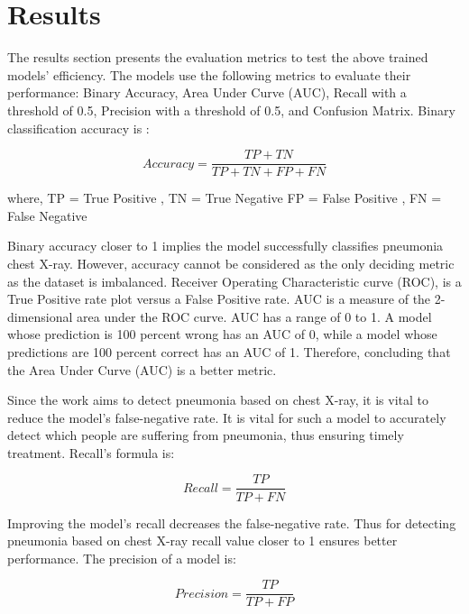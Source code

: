 \documentclass[conference]{IEEEtran}
\begin{document}
\section{Results}
The results section presents the evaluation metrics to test the above trained models’ efficiency. The models use the following metrics to evaluate their performance: Binary Accuracy, Area Under Curve (AUC), Recall with a threshold of 0.5, Precision with a threshold of 0.5, and Confusion Matrix. Binary classification accuracy is :


\begin{equation}
   Accuracy=\frac{TP +TN}{TP +TN + FP +FN}
\end{equation}

where,
\newline
TP = True Positive , TN = True Negative \newline
FP = False Positive , FN = False Negative  
\newline
\par
Binary accuracy closer to 1 implies the model successfully classifies pneumonia chest X-ray. However, accuracy cannot be considered as the only deciding metric as the dataset is imbalanced. Receiver Operating Characteristic curve (ROC), is a True Positive rate plot versus a False Positive rate. AUC is a measure of the 2-dimensional area under the ROC curve. AUC has a range of 0 to 1. A model whose prediction is 100 percent wrong has an AUC of 0, while a model whose predictions are 100 percent correct has an AUC of 1. Therefore, concluding that the Area Under Curve (AUC) is a better metric. 

Since the work aims to detect pneumonia based on chest X-ray, it is vital to reduce the model’s false-negative rate. It is vital for such a model to accurately detect which people are suffering from pneumonia, thus ensuring timely treatment. Recall's formula is:

\begin{equation}
   Recall=\frac{TP}{TP + FN}
\end{equation}


\par
Improving the model's recall decreases the false-negative rate. Thus for detecting pneumonia based on chest X-ray recall value closer to 1 ensures better performance. The precision of a model is:

\begin{equation}
   Precision=\frac{TP}{TP + FP}
\end{equation}
\end{document}
